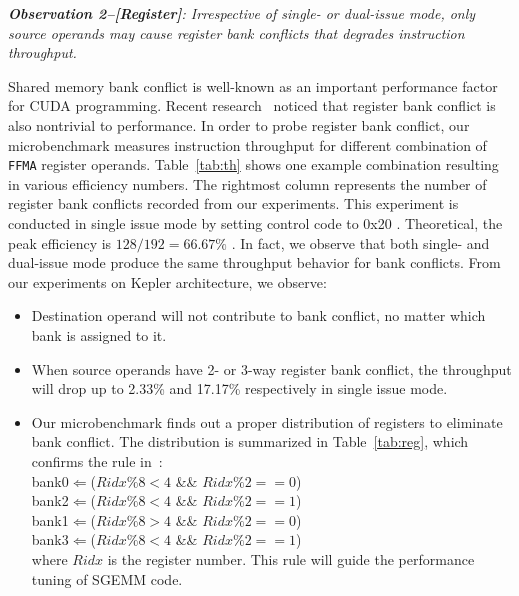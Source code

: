 {\em {\bf Observation 2--[Register]}: 
Irrespective of single- or dual-issue mode, only source operands may cause register bank conflicts that degrades instruction throughput.}

Shared memory bank conflict is well-known as an important performance factor for CUDA programming.
Recent research~\cite{lai} noticed that register bank conflict is also nontrivial to performance. 
In order to probe 
register bank conflict, our microbenchmark measures instruction throughput for different combination of {\tt FFMA} 
register operands. 
Table~\ref{tab:th} shows one example combination resulting in various efficiency numbers. 
The rightmost column represents the number of register bank conflicts recorded from our experiments. 
This experiment is conducted 
in single issue mode by setting control code to 0x20 . 
Theoretical, the peak efficiency is $128/192=66.67\%$ . 
In fact, we observe that both single- and dual-issue mode produce the same throughput behavior for bank conflicts.
From our experiments on Kepler architecture, we observe:
\begin{itemize}
\item Destination operand will not contribute to bank conflict, no matter which bank is assigned to it.
\item When source operands have 2- or 3-way register bank conflict, the throughput will drop up to 2.33\% and 17.17\% respectively in single issue mode. 
\item Our microbenchmark finds out a proper distribution of registers to eliminate bank
     conflict. 
     The distribution is summarized in Table~\ref{tab:reg}, which confirms the rule in~\cite{lai}: \\
 bank0$\Leftarrow$($Ridx \% 8 < 4$ \&\& $Ridx \% 2 == 0$) \\
 bank2$\Leftarrow$($Ridx \% 8 < 4$ \&\& $Ridx \% 2 == 1$) \\
bank1$\Leftarrow$($Ridx \% 8 > 4$ \&\& $Ridx \%2 == 0$) \\
bank3$\Leftarrow$($Ridx \% 8 < 4$ \&\& $Ridx\% 2 == 1$)\\
where $Ridx$ is the register number. 
This rule will guide the performance tuning of SGEMM code.

\end{itemize}

